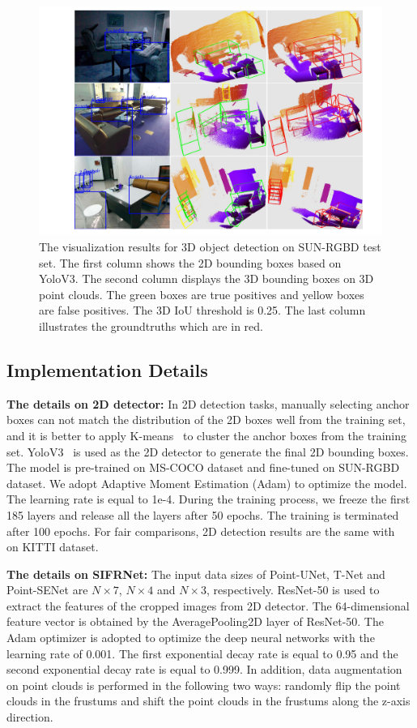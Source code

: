 \documentclass[letterpaper]{article}
\begin{document}
\begin{figure}[h]
\begin{center}
  \includegraphics[width=0.95\linewidth]{SUN_Results.pdf}
\end{center}
\caption{The visualization results for 3D object detection on SUN-RGBD test set. The first column shows the 2D bounding boxes based on YoloV3. The second column displays the 3D bounding boxes on 3D point clouds. The green boxes are true positives and yellow boxes are false positives. The 3D IoU threshold is 0.25. The last column illustrates the groundtruths which are in red.}
\end{figure}


\subsection{Implementation Details}
{\bf The details on 2D detector:} In 2D detection tasks, manually selecting anchor boxes can not match the distribution of the 2D boxes well from the training set, and it is better to apply K-means~\cite{jain2010data} to cluster the anchor boxes from the training set. YoloV3~\cite{redmon2018yolov3} is used as the 2D detector to generate the final 2D bounding boxes. The model is pre-trained on MS-COCO dataset and fine-tuned on SUN-RGBD dataset. We adopt Adaptive Moment Estimation (Adam) to optimize the model. The learning rate is equal to 1e-4. During the training process, we freeze the first 185 layers and release all the layers after 50 epochs. The training is terminated after 100 epochs. For fair comparisons, 2D detection results are the same with~\cite{qi2017frustum} on KITTI dataset.

{\bf The details on SIFRNet:} The input data sizes of Point-UNet, T-Net and Point-SENet are $N{\times}7$, $N{\times}4$ and $N{\times}3$, respectively. ResNet-50 is used to extract the features of the cropped images from 2D detector. The 64-dimensional feature vector is obtained by the AveragePooling2D layer of ResNet-50. The Adam optimizer is adopted to optimize the deep neural networks with the learning rate of 0.001. The first exponential decay rate is equal to 0.95 and the second exponential decay rate is equal to 0.999. In addition, data augmentation on point clouds is performed in the following two ways: randomly flip the point clouds in the frustums and shift the point clouds in the frustums along the z-axis direction.
\end{document}
